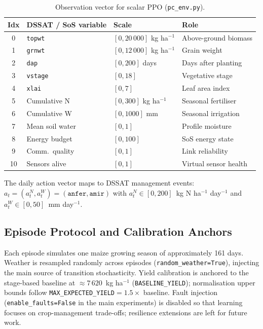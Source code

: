 \begin{table}[ht]
\centering
\caption{Observation vector for scalar PPO (\texttt{pc\_env.py}).}
\label{tab:obs}
\small
\renewcommand{\arraystretch}{1.2}
\begin{tabular}{clll}
\toprule
\textbf{Idx} & \textbf{DSSAT / SoS variable} & \textbf{Scale} & \textbf{Role} \\
\midrule
0  & \texttt{topwt}  & $[0, 20\,000]$ kg ha$^{-1}$ & Above-ground biomass \\
1  & \texttt{grnwt}  & $[0, 12\,000]$ kg ha$^{-1}$ & Grain weight \\
2  & \texttt{dap}    & $[0, 200]$ days             & Days after planting \\
3  & \texttt{vstage} & $[0, 18]$                   & Vegetative stage \\
4  & \texttt{xlai}   & $[0, 7]$                    & Leaf area index \\
5  & Cumulative N    & $[0, 300]$ kg ha$^{-1}$     & Seasonal fertiliser \\
6  & Cumulative W    & $[0, 1000]$ mm              & Seasonal irrigation \\
7  & Mean soil water & $[0, 1]$                    & Profile moisture \\
8  & Energy budget   & $[0, 100]$                  & SoS energy state \\
9  & Comm.\ quality  & $[0, 1]$                    & Link reliability \\
10 & Sensors alive   & $[0, 1]$                    & Virtual sensor health \\
\bottomrule
\end{tabular}
\end{table}

The daily action vector maps to DSSAT management events:
$a_t=(a_t^{N},a_t^{W})=(\texttt{anfer},\texttt{amir})$ with
$a_t^{N}\in[0,200]$~kg N ha$^{-1}$ day$^{-1}$ and
$a_t^{W}\in[0,50]$~mm day$^{-1}$.


\subsection{Episode Protocol and Calibration Anchors}

Each episode simulates one maize growing season of approximately 161 days.
Weather is resampled randomly across episodes (\texttt{random\_weather=True}),
injecting the main source of transition stochasticity. Yield calibration is
anchored to the stage-based baseline at ${\approx}7\,620$~kg ha$^{-1}$
(\texttt{BASELINE\_YIELD}); normalisation upper bounds follow
\texttt{MAX\_EXPECTED\_YIELD}$=1.5\times$ baseline. Fault injection
(\texttt{enable\_faults=False} in the main experiments) is disabled so that
learning focuses on crop-management trade-offs; resilience extensions are left
for future work.


